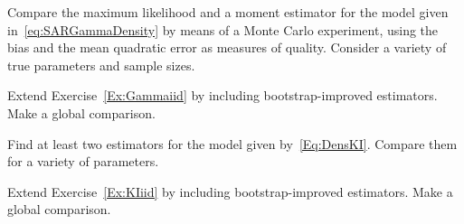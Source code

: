 \begin{exer}\label{Ex:Gammaiid}
Compare the maximum likelihood and a moment estimator for the model given in~\eqref{eq:SARGammaDensity} by means of a Monte Carlo experiment, using the bias and the mean quadratic error as measures of quality.
Consider a variety of true parameters and sample sizes.
\end{exer}

\begin{exer}
Extend Exercise~\ref{Ex:Gammaiid} by including bootstrap-improved estimators.
Make a global comparison.
\end{exer}

\begin{exer}\label{Ex:KIiid}
Find at least two estimators for the model given by~\eqref{Eq:DensKI}.
Compare them for a variety of parameters.
\end{exer}

\begin{exer}
Extend Exercise~\ref{Ex:KIiid} by including bootstrap-improved estimators.
Make a global comparison.
\end{exer}
